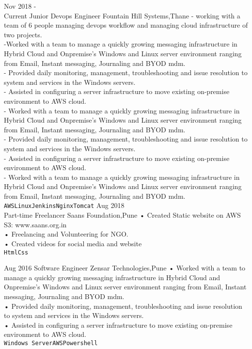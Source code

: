 \documentclass[9pt]{developercv} %
\begin{document}

\begin{entrylist}
	\entry
		{Nov 2018 -\\Current}
		{Junior Devops Engineer}
		{Fountain Hill Systems,Thane}
		{- working with a team of 6 people managing devops workflow and managing cloud infrastructure of two projects.\\
		-Worked with a team to manage a quickly growing messaging infrastructure in Hybrid Cloud and Onpremise's Windows and Linux server
environment ranging
from Email, Instant messaging, Journaling and BYOD mdm.\\- Provided daily monitoring, management, troubleshooting and issue resolution to
system and services in the Windows servers.\\ - Assisted in configuring a server infrastructure to move existing on-premise
environment to AWS cloud.\\- Worked with a team to manage a quickly growing messaging infrastructure in Hybrid Cloud and Onpremise's Windows and Linux server
environment ranging
from Email, Instant messaging, Journaling and BYOD mdm.\\- Provided daily monitoring, management, troubleshooting and issue resolution to
system and services in the Windows servers.\\ - Assisted in configuring a server infrastructure to move existing on-premise
environment to AWS cloud.\\- Worked with a team to manage a quickly growing messaging infrastructure in Hybrid Cloud and Onpremise's Windows and Linux server
environment ranging
from Email, Instant messaging, Journaling and BYOD mdm.\\ \texttt{AWS}\slashsep\texttt{Linux}\slashsep\texttt{Jenkins}\slashsep\texttt{Nginx}\slashsep\texttt{Tomcat}}
	\entry
		{Aug 2018\\\footnotesize{Part-time}}
		{Freelancer}
		{Saans Foundation,Pune}
		{• Created Static website on AWS S3: www.saans.org.in \\ 
	    • Freelancing and Volunteering for NGO. \\
	   • Created videos for social media and website\\\texttt{Html}\slashsep\texttt{Css}}
		
	\entry
		{Aug 2016}
		{Software Engineer}
		{Zensar Technologies,Pune}
		{• Worked with a team to manage a quickly growing messaging infrastructure in Hybrid Cloud and Onpremise's Windows and Linux server
environment ranging
from Email, Instant messaging, Journaling and BYOD mdm.\\• Provided daily monitoring, management, troubleshooting and issue resolution to
system and services in the Windows servers.\\ • Assisted in configuring a server infrastructure to move existing on-premise
environment to AWS cloud.\\ \texttt{Windows Server}\slashsep\texttt{AWS}\slashsep\texttt{Powershell}}
\end{entrylist}
\end{document}
